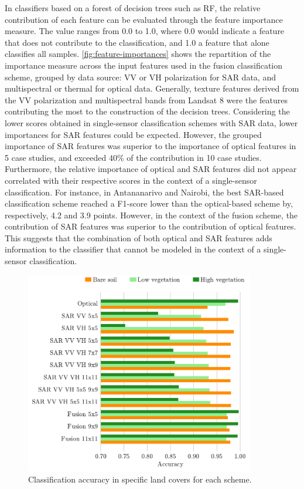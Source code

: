 \documentclass[remotesensing,article,submit,moreauthors,pdftex,10pt,a4paper]{Definitions/mdpi}
\begin{document}
In classifiers based on a forest of decision trees such as RF, the relative
contribution of each feature can be evaluated through the feature importance
measure. The value ranges from 0.0 to 1.0, where 0.0 would indicate a feature
that does not contribute to the classification, and 1.0 a feature that alone
classifies all samples. \autoref{fig:feature-importances} shows the repartition
of the importance measure across the input features used in the fusion
classification scheme, grouped by data source: VV or VH polarization for SAR
data, and multispectral or thermal for optical data. Generally, texture features
derived from the VV polarization and multispectral bands from Landsat 8 were the
features contributing the most to the construction of the decision trees.
Considering the lower scores obtained in single-sensor classification schemes
with SAR data, lower importances for SAR features could be expected. However,
the grouped importance of SAR features was superior to the importance of optical
features in 5 case studies, and exceeded 40\% of the contribution in 10 case
studies. Furthermore, the relative importance of optical and SAR features did
not appear correlated with their respective scores in the context of a
single-sensor classification. For instance, in Antananarivo and Nairobi, the
best SAR-based classification scheme reached a F1-score lower than the
optical-based scheme by, respectively, 4.2 and 3.9 points. However, in the
context of the fusion scheme, the contribution of SAR features was superior to
the contribution of optical features. This suggests that the combination of both
optical and SAR features adds information to the classifier that cannot be
modeled in the context of a single-sensor classification.

\begin{figure}[H]
    \centering
    \includegraphics[width=10cm]{figures/accuracy_per_landcover.pdf}
    \caption{Classification accuracy in specific land covers for each scheme.}
    \label{fig:accuracy-landcover}
\end{figure}
\end{document}
